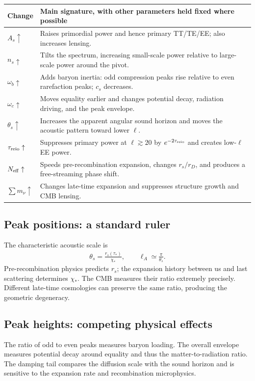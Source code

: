 \documentclass[12pt]{article}
\newcommand{\be}{\begin{eqnarray}}
\newcommand{\ee}{\end{eqnarray}}
\begin{document}
\begin{center}
\begin{tabular}{@{}p{.20\linewidth}p{.70\linewidth}@{}}\toprule
Change & Main signature, with other parameters held fixed where possible\\ \midrule
$A_s\uparrow$ & Raises primordial power and hence primary TT/TE/EE; also increases lensing.\\
$n_s\uparrow$ & Tilts the spectrum, increasing small-scale power relative to large-scale power around the pivot.\\
$\omega_b\uparrow$ & Adds baryon inertia: odd compression peaks rise relative to even rarefaction peaks; $c_s$ decreases.\\
$\omega_c\uparrow$ & Moves equality earlier and changes potential decay, radiation driving, and the peak envelope.\\
$\theta_s\uparrow$ & Increases the apparent angular sound horizon and moves the acoustic pattern toward lower $\ell$.\\
$\tau_{\rm reio}\uparrow$ & Suppresses primary power at $\ell\gtrsim20$ by $e^{-2\tau_{\rm reio}}$ and creates low-$\ell$ EE power.\\
$N_{\rm eff}\uparrow$ & Speeds pre-recombination expansion, changes $r_s/r_D$, and produces a free-streaming phase shift.\\
$\sum m_\nu\uparrow$ & Changes late-time expansion and suppresses structure growth and CMB lensing.\\ \bottomrule
\end{tabular}
\end{center}

\subsection{Peak positions: a standard ruler}
The characteristic acoustic scale is
\be
\theta_s=\frac{r_s(\tau_*)}{\chi_*},
\qquad \ell_A\simeq\frac{\pi}{\theta_s}.
\ee
Pre-recombination physics predicts $r_s$; the expansion history between us and last
scattering determines $\chi_*$. The CMB measures their ratio extremely precisely.
Different late-time cosmologies can preserve the same ratio, producing the geometric
degeneracy.

\subsection{Peak heights: competing physical effects}
The ratio of odd to even peaks measures baryon loading. The overall envelope measures
potential decay around equality and thus the matter-to-radiation ratio. The damping
tail compares the diffusion scale with the sound horizon and is sensitive to the
expansion rate and recombination microphysics.
\end{document}
